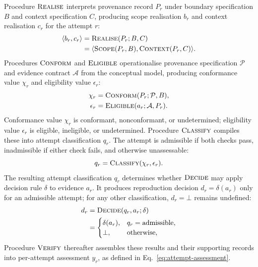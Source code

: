 \documentclass[conference,a4paper]{IEEEtran}
\begin{document}
  Procedure $\operatorname{\textsc{Realise}}$ interprets provenance record $P_r$ under boundary specification $B$ and context specification $C$, producing scope realisation $b_r$ and context realisation $c_r$ for the attempt $r$:
  \begin{align}
    \langle b_r,c_r\rangle
      &=\operatorname{\textsc{Realise}}(P_r;B,C) \nonumber\\
      &=\langle\operatorname{\textsc{Scope}}(P_r,B),\operatorname{\textsc{Context}}(P_r,C)\rangle.
      \label{eq:realise-procedure}
  \end{align}
  Procedures $\operatorname{\textsc{Conform}}$ and $\operatorname{\textsc{Eligible}}$ operationalise provenance specification $\mathcal P$ and evidence contract $\mathcal A$ from the conceptual model, producing conformance value $\chi_r$ and eligibility value $\epsilon_r$:
  \begin{equation}
    \begin{aligned}
      \chi_r &= \operatorname{\textsc{Conform}}(P_r;\mathcal P,B),\\
      \epsilon_r &= \operatorname{\textsc{Eligible}}(a_r;\mathcal A,P_r).
    \end{aligned}
    \label{eq:assessment-checks}
  \end{equation}
  Conformance value $\chi_r$ is conformant, nonconformant, or undetermined; eligibility value $\epsilon_r$ is eligible, ineligible, or undetermined. Procedure $\operatorname{\textsc{Classify}}$ compiles these into attempt classification $q_r$. The attempt is admissible if both checks pass, inadmissible if either check fails, and otherwise unassessable:
  \begin{equation}
    q_r=\operatorname{\textsc{Classify}}(\chi_r,\epsilon_r).
    \label{eq:classify-procedure}
  \end{equation}
  The resulting attempt classification $q_r$ determines whether $\operatorname{\textsc{Decide}}$ may apply decision rule $\delta$ to evidence $a_r$. It produces reproduction decision $d_r=\delta(a_r)$ only for an admissible attempt; for any other classification, $d_r=\bot$ remains undefined:
  \begin{align}
    d_r
      &=\operatorname{\textsc{Decide}}(q_r,a_r;\delta) \nonumber\\
      &=
      \begin{cases}
        \delta(a_r), & q_r=\mathrm{admissible},\\
        \bot, & \text{otherwise},
      \end{cases}
      \label{eq:decision-procedure}
  \end{align}
  Procedure $\operatorname{\textsc{Verify}}$ thereafter assembles these results and their supporting records into per-attempt assessment $y_r$, as defined in Eq.~\eqref{eq:attempt-assessment}.
\end{document}
